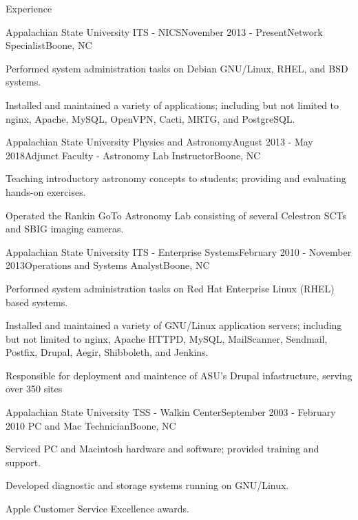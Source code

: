 \documentclass{cv} %
\begin{document}
\begin{rSection}{Experience}

\begin{rSubsection}{Appalachian State University ITS - NICS}{November 2013 - Present}{Network Specialist}{Boone, NC}
\item Performed system administration tasks on Debian GNU/Linux, RHEL, and BSD systems.
\item Installed and maintained a variety of applications; including but not limited to nginx, Apache, MySQL, OpenVPN, Cacti, MRTG, and PostgreSQL.
\end{rSubsection}

\begin{rSubsection}{Appalachian State University Physics and Astronomy}{August 2013 - May 2018}{Adjunct Faculty - Astronomy Lab Instructor}{Boone, NC}
\item Teaching introductory astronomy concepts to students; providing and evaluating hands-on exercises.
\item Operated the Rankin GoTo Astronomy Lab consisting of several Celestron SCTs and SBIG imaging cameras.
\end{rSubsection}

\begin{rSubsection}{Appalachian State University ITS - Enterprise Systems}{February 2010 - November 2013}{Operations and Systems Analyst}{Boone, NC}
\item Performed system administration tasks on Red Hat Enterprise Linux (RHEL) based systems.
\item Installed and maintained a variety of GNU/Linux application servers; including but not limited to nginx, Apache HTTPD, MySQL, MailScanner, Sendmail, Postfix, Drupal, Aegir, Shibboleth, and Jenkins.
\item Responsible for deployment and maintence of ASU's Drupal infastructure, serving over 350 sites
\end{rSubsection}

\begin{rSubsection}{Appalachian State University TSS - Walkin Center}{September 2003 - February 2010
}{PC and Mac Technician}{Boone, NC}
\item Serviced PC and Macintosh hardware and software; provided training and support.
\item Developed diagnostic and storage systems running on GNU/Linux.
\item Apple Customer Service Excellence awards.
\end{rSubsection}


\end{rSection}
\end{document}
